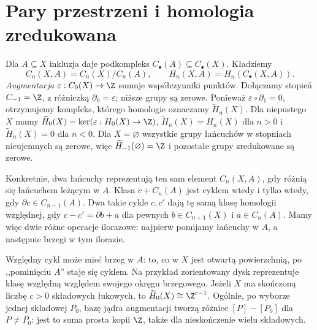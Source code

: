 \section{Pary przestrzeni i homologia zredukowana}
\label{sec:homologia-wzgledna}

\begin{definicja}
\label{def:homologia-wzgledna}
Dla $A\subseteq X$ inkluzja daje
podkompleks $C_\bullet(A)\subseteq C_\bullet(X)$.
Kładziemy
\[
 C_n(X,A)=C_n(X)/C_n(A),\qquad
 H_n(X,A)=H_n(C_\bullet(X,A)).
\]
\emph{Augmentacja} $\varepsilon:C_0(X)\to\Z$ sumuje
współczynniki punktów. Dołączamy stopień $C_{-1}=\Z$,
z różniczką $\partial_0=\varepsilon$; niższe grupy są zerowe.
Ponieważ $\varepsilon\circ\partial_1=0$, otrzymujemy kompleks,
którego homologie oznaczamy $\widetilde H_n(X)$.
Dla niepustego $X$ mamy
$\widetilde H_0(X)=\ker(\varepsilon:H_0(X)\to\Z)$,
$\widetilde H_n(X)=H_n(X)$ dla $n>0$ i
$\widetilde H_n(X)=0$ dla $n<0$.
Dla $X=\varnothing$ wszystkie grupy łańcuchów w stopniach
nieujemnych są zerowe, więc $\widetilde H_{-1}(\varnothing)=\Z$
i pozostałe grupy zredukowane są zerowe.
\end{definicja}

Konkretnie, dwa łańcuchy reprezentują ten sam element $C_n(X,A)$,
gdy różnią się łańcuchem leżącym w $A$. Klasa $c+C_n(A)$ jest
cyklem wtedy i tylko wtedy, gdy $\partial c\in C_{n-1}(A)$.
Dwa takie cykle $c,c'$ dają tę samą klasę homologii względnej,
gdy $c-c'=\partial b+a$ dla pewnych $b\in C_{n+1}(X)$
i $a\in C_n(A)$. Mamy więc dwie różne operacje ilorazowe:
najpierw pomijamy łańcuchy w $A$, a następnie brzegi w tym ilorazie.

Względny cykl może mieć brzeg w $A$:
to, co w $X$ jest otwartą powierzchnią,
po ,,pominięciu $A$'' staje się cyklem.
Na przykład zorientowany dysk reprezentuje klasę względną
względem swojego okręgu brzegowego.
Jeżeli $X$ ma skończoną liczbę $c>0$ składowych łukowych,
to $\widetilde H_0(X)\cong\Z^{c-1}$.
Ogólnie, po wyborze jednej składowej $P_0$, bazę jądra
augmentacji tworzą różnice $[P]-[P_0]$ dla $P\ne P_0$:
jest to suma prosta kopii $\Z$, także dla nieskończenie wielu składowych.

